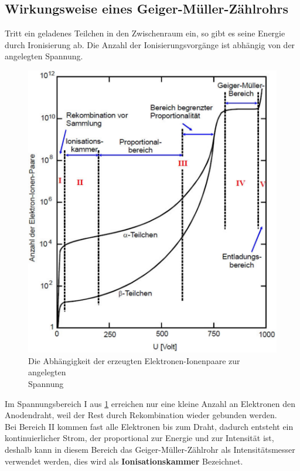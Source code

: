 \subsection{Wirkungsweise eines Geiger-Müller-Zählrohrs}
Tritt ein geladenes Teilchen in den Zwischenraum ein, so gibt es seine Energie durch Ironisierung ab. Die Anzahl der Ionisierungsvorgänge ist abhängig von der angelegten Spannung.\\
\begin{figure}[h!]
\centering
\includegraphics[scale=0.5]{Grafiken/Theorie1.pdf}
\caption{Die Abhängigkeit der erzeugten Elektronen-Ionenpaare zur angelegten\\ Spannung \cite{V703} \label{Th2}}
\end{figure}
Im Spannungsbereich I aus \cref{Th2} erreichen nur eine kleine Anzahl an Elektronen den Anodendraht, weil der Rest durch Rekombination wieder gebunden werden. \\
Bei Bereich II kommen fast alle Elektronen bis zum Draht, dadurch entsteht ein kontinuierlicher Strom, der proportional zur Energie und zur Intensität ist, deshalb kann in diesem Bereich das Geiger-Müller-Zählrohr als Intensitätsmesser verwendet werden, dies wird als \textbf{Ionisationskammer} Bezeichnet.\newpage
